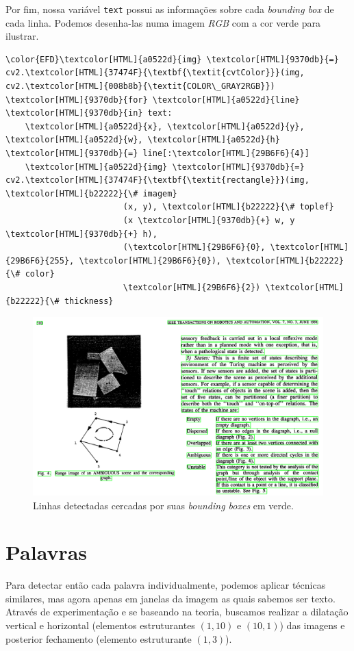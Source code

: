 \documentclass[twocolumn, 10pt]{article}
\begin{document}
Por fim, nossa variável \texttt{text} possui as informações sobre cada \emph{bounding box} de cada linha.
Podemos desenha-las numa imagem \emph{RGB} com a cor verde para ilustrar.
\begin{Code}
\begin{Verbatim}
\color{EFD}\textcolor[HTML]{a0522d}{img} \textcolor[HTML]{9370db}{=} cv2.\textcolor[HTML]{37474F}{\textbf{\textit{cvtColor}}}(img, cv2.\textcolor[HTML]{008b8b}{\textit{COLOR\_GRAY2RGB}})
\textcolor[HTML]{9370db}{for} \textcolor[HTML]{a0522d}{line} \textcolor[HTML]{9370db}{in} text:
    \textcolor[HTML]{a0522d}{x}, \textcolor[HTML]{a0522d}{y}, \textcolor[HTML]{a0522d}{w}, \textcolor[HTML]{a0522d}{h} \textcolor[HTML]{9370db}{=} line[:\textcolor[HTML]{29B6F6}{4}]
    \textcolor[HTML]{a0522d}{img} \textcolor[HTML]{9370db}{=} cv2.\textcolor[HTML]{37474F}{\textbf{\textit{rectangle}}}(img, \textcolor[HTML]{b22222}{\# imagem}
                        (x, y), \textcolor[HTML]{b22222}{\# toplef}
                        (x \textcolor[HTML]{9370db}{+} w, y \textcolor[HTML]{9370db}{+} h),
                        (\textcolor[HTML]{29B6F6}{0}, \textcolor[HTML]{29B6F6}{255}, \textcolor[HTML]{29B6F6}{0}), \textcolor[HTML]{b22222}{\# color}
                        \textcolor[HTML]{29B6F6}{2}) \textcolor[HTML]{b22222}{\# thickness}
\end{Verbatim}
\end{Code}
\begin{figure}[htbp]
\centering
\includegraphics[width=.9\linewidth]{./img/lines.png}
\caption{Linhas detectadas cercadas por suas \emph{bounding boxes} em verde.}
\end{figure}

\section*{Palavras}
\label{sec:orgb1308cc}
Para detectar então cada palavra individualmente, podemos aplicar técnicas similares, mas agora apenas em janelas da imagem as quais sabemos ser texto.
Através de experimentação e se baseando na teoria, buscamos realizar a dilatação vertical e horizontal (elementos estruturantes \((1,10)\) e \((10,1)\)) das imagens e posterior fechamento (elemento estruturante \((1,3)\)).
\end{document}
